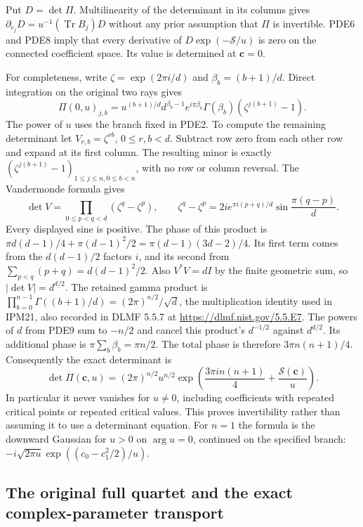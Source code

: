Put $D=\det\Pi$. Multilinearity of the determinant in its columns
gives $\partial_{c_j}D=u^{-1}(\operatorname{Tr}B_j)D$ without any
prior assumption that $\Pi$ is invertible. PDE6 and PDE8 imply that
every derivative of $D\exp(-\mathcal S/u)$ is zero on the connected
coefficient space. Its value is determined at $\mathbf c=0$.

For completeness, write $\zeta=\exp(2\pi i/d)$ and
$\beta_b=(b+1)/d$. Direct integration on the original two rays gives
\[
 \Pi(0,u)_{j,b}
  =u^{(b+1)/d}d^{\beta_b-1}
          e^{i\pi\beta_b}\Gamma(\beta_b)
                       (\zeta^{j(b+1)}-1).
 \tag{PDE9}
\]
The power of $u$ uses the branch fixed in PDE2. To compute the remaining
determinant let $V_{r,b}=\zeta^{rb}$, $0\leq r,b<d$. Subtract row zero
from each other row and expand at its first column. The resulting
minor is exactly $(\zeta^{j(b+1)}-1)_{1\leq j\leq n,0\leq b<n}$,
with no row or column reversal. The Vandermonde formula gives
\[
 \det V=\prod_{0\leq p<q<d}(\zeta^q-\zeta^p),\qquad
 \zeta^q-\zeta^p
       =2i e^{\pi i(p+q)/d}\sin\frac{\pi(q-p)}d.
 \tag{PDE10}
\]
Every displayed sine is positive. The phase of this product is
$\pi d(d-1)/4+\pi(d-1)^2/2
=\pi(d-1)(3d-2)/4$.
Its first term comes from the $d(d-1)/2$ factors $i$, and its second
from $\sum_{p<q}(p+q)=d(d-1)^2/2$.
Also $V^*V=dI$ by the finite geometric sum, so $|\det V|=d^{d/2}$.
The retained gamma product is
$\prod_{b=0}^{n-1}\Gamma((b+1)/d)=(2\pi)^{n/2}/\sqrt d$,
the multiplication identity used in IPM21, also recorded in DLMF
5.5.7 at \url{https://dlmf.nist.gov/5.5.E7}.
The powers of $d$ from PDE9 sum to $-n/2$ and cancel this product's
$d^{-1/2}$ against $d^{d/2}$. Its additional phase is
$\pi\sum_b\beta_b=\pi n/2$. The total phase is therefore
$3\pi n(n+1)/4$. Consequently the exact determinant is
\[
 \boxed{\displaystyle
 \det\Pi(\mathbf c,u)
   =(2\pi)^{n/2}u^{n/2}
       \exp\left(\frac{3\pi i n(n+1)}4
                         +\frac{\mathcal S(\mathbf c)}u\right).}
 \tag{PDE11}
\]
In particular it never vanishes for $u\ne0$, including coefficients
with repeated critical points or repeated critical values. This proves
invertibility rather than assuming it to use a determinant equation.
For $n=1$ the formula is the downward Gaussian for $u>0$ on
$\arg u=0$, continued on the specified branch:
$-i\sqrt{2\pi u}\exp((c_0-c_1^2/2)/u)$.

\subsection{The original full quartet and the exact complex-parameter transport}


